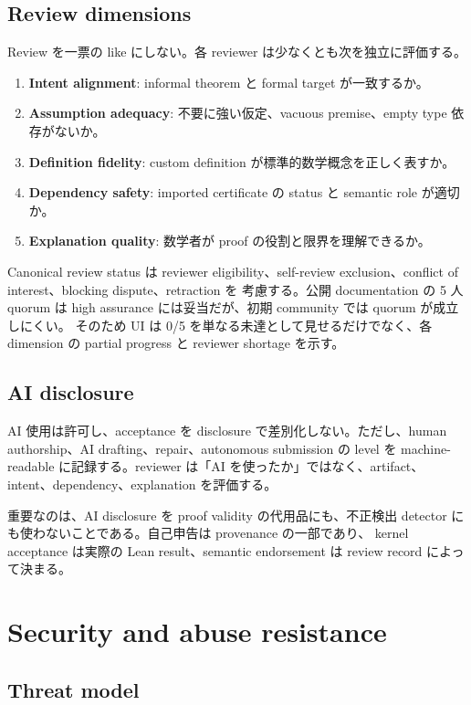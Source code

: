 \documentclass[a4paper,11pt]{ltjsarticle}
\newcommand{\term}[1]{\textbf{\color{TFNavy}#1}}
\begin{document}
\subsection{Review dimensions}

Review を一票の like にしない。各 reviewer は少なくとも次を独立に評価する。

\begin{enumerate}
  \item \term{Intent alignment}: informal theorem と formal target が一致するか。
  \item \term{Assumption adequacy}: 不要に強い仮定、vacuous premise、empty type 依存がないか。
  \item \term{Definition fidelity}: custom definition が標準的数学概念を正しく表すか。
  \item \term{Dependency safety}: imported certificate の status と semantic role が適切か。
  \item \term{Explanation quality}: 数学者が proof の役割と限界を理解できるか。
\end{enumerate}

Canonical review status は reviewer eligibility、self-review exclusion、conflict of interest、blocking dispute、retraction を
考慮する。公開 documentation の 5 人 quorum は high assurance には妥当だが、初期 community では quorum が成立しにくい。
そのため UI は 0/5 を単なる未達として見せるだけでなく、各 dimension の partial progress と reviewer shortage を示す。

\subsection{AI disclosure}

AI 使用は許可し、acceptance を disclosure で差別化しない。ただし、human authorship、AI drafting、repair、autonomous submission
の level を machine-readable に記録する。reviewer は「AI を使ったか」ではなく、artifact、intent、dependency、explanation を評価する。

重要なのは、AI disclosure を proof validity の代用品にも、不正検出 detector にも使わないことである。自己申告は provenance の一部であり、
kernel acceptance は実際の Lean result、semantic endorsement は review record によって決まる。

\section{Security and abuse resistance}

\subsection{Threat model}
\end{document}
